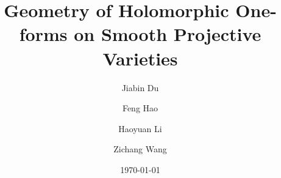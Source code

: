 \documentclass[a4paper,12pt,reqno]{amsart}
\theoremstyle{question}
\theoremstyle{definition}
\theoremstyle{remark}
\theoremstyle{cited}
\theoremstyle{citeddef}
\begin{document}
\title[Geometry of Holomorphic One-forms on Smooth Projective Varieties]{Geometry of Holomorphic One-forms on Smooth Projective Varieties}
\author{Jiabin Du}
\address{Shanghai Institute for Mathematics and Interdisciplinary Sciences (SIMIS), Shanghai 200433, China}
\address{Research Institute of Intelligent Complex Systems, Fudan University, Shanghai 200433, China}

\author{Feng Hao}
\address{School of Mathematics\\ Shandong University\\ Jinan 250100\\ China}

\author{Haoyuan Li}
\address{School of Mathematics\\ Shandong University\\ Jinan 250100\\ China}

\author{Zichang Wang}
\address{School of Mathematical Science\\ University of Science and Technology of China\\ Hefei 230026\\ China}



\date{\today}


 
\end{document}
